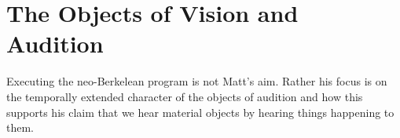 \documentclass[12pt]{article}
\begin{document}

\section{The Objects of Vision and Audition} %
\label{sec:the_objects_of_vision_and_audition}

Executing the neo-Berkelean program is not Matt's aim. Rather his focus is on the temporally extended character of the objects of audition and how this supports his claim that we hear material objects by hearing things happening to them. 


 
 
\end{document}
